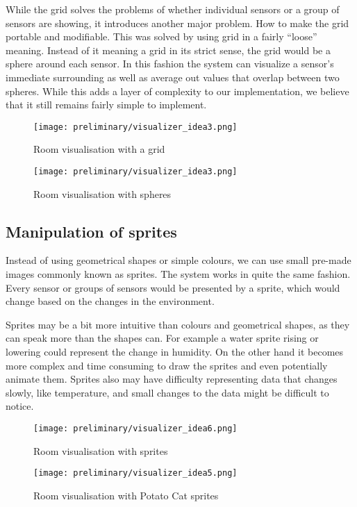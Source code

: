 \documentclass[../document]{subfiles}
\begin{document}
While the grid solves the problems of whether individual sensors or a group of sensors are showing, it introduces another major problem. How to make the grid portable and modifiable. This was solved by using grid in a fairly “loose” meaning. Instead of it meaning a grid in its strict sense, the grid would be a sphere around each sensor. In this fashion the system can visualize a sensor’s immediate surrounding as well as average out values that overlap between two spheres. While this adds a layer of complexity to our implementation, we believe that it still remains fairly simple to implement.

\begin{figure}
\texttt{[image: preliminary/visualizer\_idea3.png]}
\caption{Room visualisation with a grid}
\end{figure}

\begin{figure}
\texttt{[image: preliminary/visualizer\_idea3.png]}
\caption{Room visualisation with spheres}
\end{figure}

\subsection{Manipulation of sprites}
Instead of using geometrical shapes or simple colours, we can use small pre-made images commonly known as sprites. The system works in quite the same fashion. Every sensor or groups of sensors would be presented by a sprite, which would change based on the changes in the environment.

Sprites may be a bit more intuitive than colours and geometrical shapes, as they can speak more than the shapes can. For example a water sprite rising or lowering could represent the change in humidity. On the other hand it becomes more complex and time consuming to draw the sprites and even potentially animate them. Sprites also may have difficulty representing data that changes slowly, like temperature, and small changes to the data might be difficult to notice.

\begin{figure}
\texttt{[image: preliminary/visualizer\_idea6.png]}
\caption{Room visualisation with sprites}
\end{figure}

\begin{figure}
\texttt{[image: preliminary/visualizer\_idea5.png]}
\caption{Room visualisation with Potato Cat sprites}
\end{figure}
\end{document}
